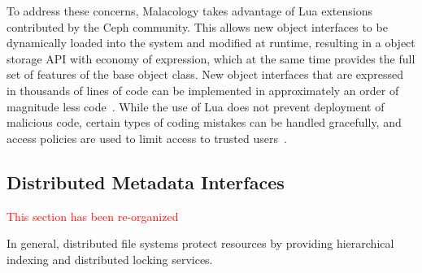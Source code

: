 To address these concerns, Malacology takes advantage of Lua extensions
contributed by the Ceph community. This allows new object interfaces to be
dynamically loaded into the system and modified at runtime, resulting in a
object storage API with economy of expression, which at the same time provides
the full set of features of the base object class. New object interfaces that
are expressed in thousands of lines of code can be implemented in approximately
an order of magnitude less code~\cite{geambasu_comet_2010}. While the use of
Lua does not prevent deployment of malicious code, certain types of coding
mistakes can be handled gracefully, and access policies are used to limit
access to trusted users~\cite{ierusalimschy1996lua}.

 

\subsection{Distributed Metadata Interfaces}
\begin{notes}
\textcolor{red}{This section has been re-organized}
\end{notes}
\label{sec:distributed-metadata-interfaces}
\label{malacology:mds}

 
In general, distributed file systems protect resources by providing
hierarchical indexing and distributed locking services.  


